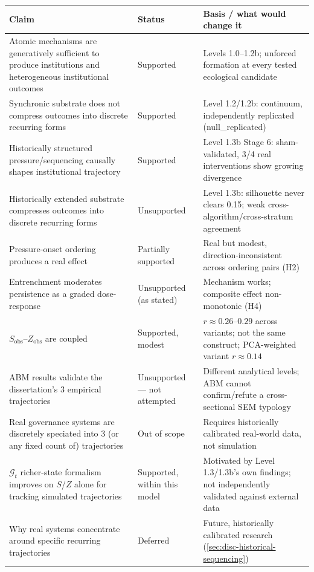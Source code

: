 \begin{tabular}{@{}p{6.2cm}p{2.4cm}p{6.2cm}@{}}
\toprule
\textbf{Claim} & \textbf{Status} & \textbf{Basis / what would change it} \\
\midrule
Atomic mechanisms are generatively sufficient to produce institutions and heterogeneous institutional outcomes & Supported & Levels 1.0--1.2b; unforced formation at every tested ecological candidate \\
Synchronic substrate does not compress outcomes into discrete recurring forms & Supported & Level 1.2/1.2b: continuum, independently replicated (null\_replicated) \\
Historically structured pressure/sequencing causally shapes institutional trajectory & Supported & Level 1.3b Stage 6: sham-validated, 3/4 real interventions show growing divergence \\
Historically extended substrate compresses outcomes into discrete recurring forms & Unsupported & Level 1.3b: silhouette never clears 0.15; weak cross-algorithm/cross-stratum agreement \\
Pressure-onset ordering produces a real effect & Partially supported & Real but modest, direction-inconsistent across ordering pairs (H2) \\
Entrenchment moderates persistence as a graded dose-response & Unsupported (as stated) & Mechanism works; composite effect non-monotonic (H4) \\
$S_{\text{obs}}$--$Z_{\text{obs}}$ are coupled & Supported, modest & $r\approx0.26$--$0.29$ across variants; not the same construct; PCA-weighted variant $r\approx0.14$ \\
ABM results validate the dissertation's 3 empirical trajectories & Unsupported --- not attempted & Different analytical levels; ABM cannot confirm/refute a cross-sectional SEM typology \\
Real governance systems are discretely speciated into 3 (or any fixed count of) trajectories & Out of scope & Requires historically calibrated real-world data, not simulation \\
$\mathcal{G}_t$ richer-state formalism improves on $S$/$Z$ alone for tracking simulated trajectories & Supported, within this model & Motivated by Level 1.3/1.3b's own findings; not independently validated against external data \\
Why real systems concentrate around specific recurring trajectories & Deferred & Future, historically calibrated research (\cref{sec:disc-historical-sequencing}) \\
\bottomrule
\end{tabular}
